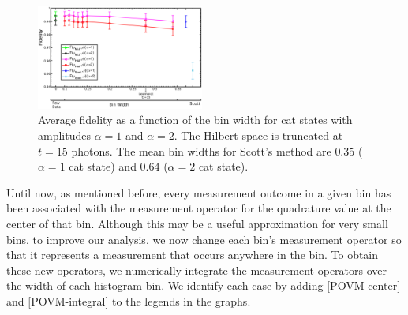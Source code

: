 \documentclass[
reprint,
superscriptaddress,
showpacs,
amsmath,
amssymb,
aps,
pra,
longbibliography
]{revtex4-1}
\begin{document}
\begin{figure}
  \includegraphics[width=0.49\textwidth]{catstate-alpha=1and2-15photons.eps}
  \caption{Average fidelity as a function of the bin width for cat
    states with amplitudes $\alpha=1$ and $\alpha=2$. The Hilbert
    space is truncated at $t=15$ photons. The mean bin widths for
    Scott's method are $0.35$ ($\alpha=1$ cat state) and $0.64$
    ($\alpha=2$ cat state).}
  \label{fig-fidelity_vs_binwidth_15_photons_catstate}
\end{figure}




Until now, as mentioned before, every measurement outcome in a given
bin has been associated with the measurement operator for the
quadrature value at the center of that bin. Although this may be a
useful approximation for very small bins, to improve our analysis, we
now change each bin's measurement operator so that it represents a
measurement that occurs anywhere in the bin. To obtain these new operators, 
we numerically integrate the measurement operators over the width of each 
histogram bin. We identify each case by adding $[$POVM-center$]$ and 
$[$POVM-integral$]$ to the legends in the graphs.
\end{document}
